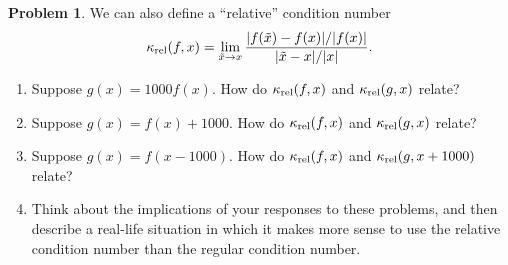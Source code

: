 \documentclass[12pt]{article}
\theoremstyle{definition}
\newtheorem{problem}{Problem}
\begin{document}
\begin{problem}
We can also define a ``relative'' condition number
    \begin{equation*}
        \kappa_{\textup{rel}}(f,x) = \lim_{\tilde{x} \to x} \frac{|f(\tilde{x}) - f(x)|/|f(x)|}{|\tilde{x}-x| / |x|}.
    \end{equation*}

    \begin{enumerate}
    \item Suppose $g(x) = 1000 f(x)$. How do $\kappa_{\textup{rel}}(f,x)$ and $\kappa_{\textup{rel}}(g,x)$ relate?
    \item Suppose $g(x) = f(x)+1000$. How do $\kappa_{\textup{rel}}(f,x)$ and $\kappa_{\textup{rel}}(g,x)$ relate?
    \item Suppose $g(x) = f(x-1000)$. How do $\kappa_{\textup{rel}}(f,x)$ and $\kappa_{\textup{rel}}(g,x+1000)$ relate?
    \item Think about the implications of your responses to these problems, and then describe a real-life situation in which it makes more sense to use the relative condition number than the regular condition number.

    \end{enumerate}
\end{problem}
\end{document}
